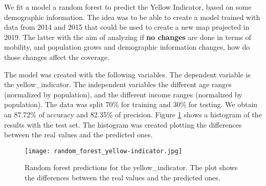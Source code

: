 We fit a model a random forest to predict the Yellow Indicator, based on some demographic information. The idea was to be able to create a model trained with data from 2014 and 2015 that could be used to create a new map projected in 2019. The latter with the aim of analyzing if \textbf{no changes} are done in terms of mobility, and population grows and demographic information changes, how do those changes affect the coverage. 

The model was created with the following variables. The dependent variable is the yellow\_indicator. The independent variables the different age ranges (normalized by population), and the different income ranges (normalized by population). The data was split 70\% for training and 30\% for testing. We obtain an 87.72\% of accuracy and 82.35\% of precision. Figure \ref{fig:randomForest} shows a histogram of the results with the test set. The histogram was created plotting the differences between the real values and the predicted  ones. 

\begin{figure}%
\centering
\texttt{[image: random\_forest\_yellow-indicator.jpg]}
\caption{Random forest predictions for the yellow\_indicator. The plot shows the differences between the real values and the predicted ones.}
\label{fig:randomForest}%
\end{figure}

